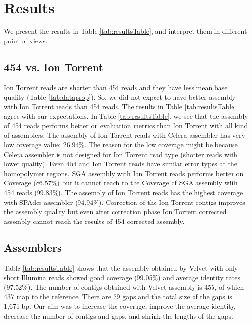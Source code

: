 \documentclass{llncs}
\begin{document}
\section{Results}
\label{bacResultsConc}

We present the results in Table \ref{tab:resultsTable}, and interpret them in different point of views. 

\subsection{454 vs. Ion Torrent}
\label{454Ion}
Ion Torrent reads are shorter than 454 reads and they have less mean base quality (Table \ref{tab:dataprop}). So, we did not expect to have better assembly with Ion Torrent reads than 454 reads. The results in Table \ref{tab:resultsTable} agree with our expectations.
In Table \ref{tab:resultsTable}, we see that the assembly of 454 reads performs better on evaluation metrics than Ion Torrent with all kind of assemblers. The assembly of Ion Torrent reads with Celera assembler has very low coverage value: 26.94\%. The reason for the low coverage might be because Celera assembler is not designed for Ion Torrent read type (shorter reads with lower quality). Even 454 and Ion Torrent reads have similar error types at the homopolymer regions. SGA assembly with Ion Torrent reads performs better on Coverage (86.57\%) but it cannot reach to the Coverage of SGA assembly with 454 reads (99.83\%). The assembly of Ion Torrent reads has the highest coverage with SPAdes assembler (94.94\%). Correction of the Ion Torrent contigs improves the assembly quality but even after correction phase Ion Torrent corrected assembly cannot reach the results of 454 corrected assembly. 

\subsection{Assemblers}
\label{res_ass}
Table \ref{tab:resultsTable} shows that the assembly obtained by Velvet with only short Illumina reads showed good coverage  (99.05\%) and average identity rates (97.52\%). The number of contigs obtained with Velvet assembly is 455, of which 437 map to the reference. There are 39 gaps and the total size of the gaps is 1,671 bp. Our aim was to increase the coverage, improve the average identity, decrease the number of contigs and gaps, and shrink the lengths of the gaps.
\end{document}
